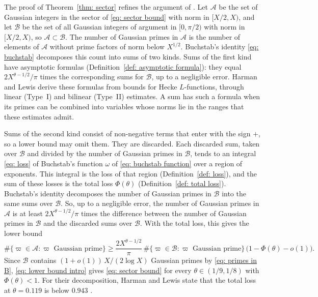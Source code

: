 \documentclass{article}
\numberwithin{equation}{section}
\newcommand{\Ge}{\geqslant}
\begin{document}
The proof of Theorem~\ref{thm: sector} refines the argument of \citet{harman2001gaussian}. Let $\mathcal{A}$ be the set of Gaussian integers in the sector of \eqref{eq: sector bound} with norm in $[X/2, X)$, and let $\mathcal{B}$ be the set of all Gaussian integers of argument in $[0, \pi/2)$ with norm in $[X/2, X)$, so $\mathcal{A} \subset \mathcal{B}$. The number of Gaussian primes in $\mathcal{A}$ is the number of elements of $\mathcal{A}$ without prime factors of norm below $X^{1/2}$. Buchstab's identity \eqref{eq: buchstab} decomposes this count into sums of two kinds. Sums of the first kind have asymptotic formulas (Definition~\ref{def: asymptotic formula}): they equal $2X^{\theta - 1/2}/\pi$ times the corresponding sums for $\mathcal{B}$, up to a negligible error. Harman and Lewis derive these formulas from bounds for Hecke $L$-functions, through linear (Type~I) and bilinear (Type~II) estimates. A sum has such a formula when its primes can be combined into variables whose norms lie in the ranges that these estimates admit.

Sums of the second kind consist of non-negative terms that enter with the sign $+$, so a lower bound may omit them. They are discarded. Each discarded sum, taken over $\mathcal{B}$ and divided by the number of Gaussian primes in $\mathcal{B}$, tends to an integral \eqref{eq: loss} of Buchstab's function $\omega$ of \eqref{eq: buchstab function} over a region of exponents. This integral is the loss of that region (Definition~\ref{def: loss}), and the sum of these losses is the total loss $\Phi(\theta)$ (Definition~\ref{def: total loss}). Buchstab's identity decomposes the number of Gaussian primes in $\mathcal{B}$ into the same sums over $\mathcal{B}$. So, up to a negligible error, the number of Gaussian primes in $\mathcal{A}$ is at least $2X^{\theta - 1/2}/\pi$ times the difference between the number of Gaussian primes in $\mathcal{B}$ and the discarded sums over $\mathcal{B}$. With the total loss, this gives the lower bound
\begin{equation}
\label{eq: lower bound intro}
\#\{\varpi \in \mathcal{A} : \varpi \text{ Gaussian prime}\} \Ge \frac{2X^{\theta - 1/2}}{\pi}\, \#\{\varpi \in \mathcal{B} : \varpi \text{ Gaussian prime}\}\, \bigl(1 - \Phi(\theta) - o(1)\bigr).
\end{equation}
Since $\mathcal{B}$ contains $(1 + o(1))\, X/(2\log X)$ Gaussian primes by \eqref{eq: primes in B}, \eqref{eq: lower bound intro} gives \eqref{eq: sector bound} for every $\theta \in (1/9, 1/8)$ with $\Phi(\theta) < 1$. For their decomposition, Harman and Lewis state that the total loss at $\theta = 0.119$ is below $0.943$ \citep[p.~134]{harman2001gaussian}.
\end{document}
